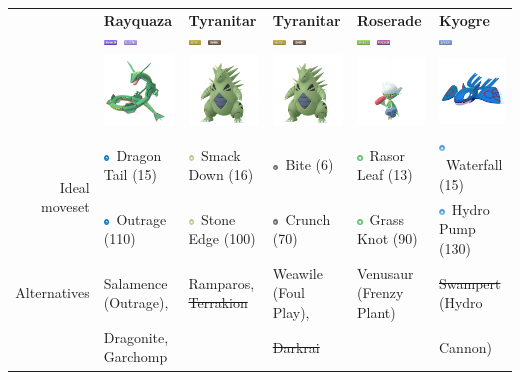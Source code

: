 \documentclass[8pt,aspectratio=169,compress]{beamer}
\newcommand{\darkfull}{\includegraphics[height=0.15cm]{../../images/type/full/Dark.png}}
\newcommand{\flyingfull}{\includegraphics[height=0.15cm]{../../images/type/full/Flying.png}}
\newcommand{\dragonfull}{\includegraphics[height=0.15cm]{../../images/type/full/Dragon.png}}
\newcommand{\grassfull}{\includegraphics[height=0.15cm]{../../images/type/full/Grass.png}}
\newcommand{\rockfull}{\includegraphics[height=0.15cm]{../../images/type/full/Rock.png}}
\newcommand{\waterfull}{\includegraphics[height=0.15cm]{../../images/type/full/Water.png}}
\newcommand{\poisonfull}{\includegraphics[height=0.15cm]{../../images/type/full/Poison.png}}
\newcommand{\dragonsimp}{\includegraphics[height=0.15cm]{../../images/type/simplified/dragon.png}}
\newcommand{\darksimp}{\includegraphics[height=0.15cm]{../../images/type/simplified/dark.png}}
\newcommand{\rocksimp}{\includegraphics[height=0.15cm]{../../images/type/simplified/rock.png}}
\newcommand{\watersimp}{\includegraphics[height=0.15cm]{../../images/type/simplified/water.png}}
\newcommand{\grasssimp}{\includegraphics[height=0.15cm]{../../images/type/simplified/grass.png}}
\begin{document}
\begin{frame}
\begin{tiny}
\begin{block}{}
\begin{center}
\bigskip

\begin{tabular}{rp{2cm}p{2cm}p{2cm}p{2cm}p{2cm}} 
    & \textbf{Rayquaza} \hfill \dragonfull~\flyingfull &  \textbf{Tyranitar} \hfill \rockfull~\darkfull &  \textbf{Tyranitar} \hfill \rockfull~\darkfull  &  \textbf{Roserade} \hfill \grassfull~\poisonfull  & \textbf{Kyogre} \hfill  \waterfull \\ 
    &  \multicolumn{1}{c}{\includegraphics[width=2cm]{../../images/pokemon/Rayquaza}} &   \multicolumn{1}{c}{\includegraphics[width=2cm]{../../images/pokemon/Tyranitar} }  &   \multicolumn{1}{c}{\includegraphics[width=2cm]{../../images/pokemon/Tyranitar} }   &   \multicolumn{1}{c}{\includegraphics[width=2cm]{../../images/pokemon/Roserade} }   &   \multicolumn{1}{c}{\includegraphics[width=2cm]{../../images/pokemon/Kyogre} } \\ \hline
\multirow{2}{*}{Ideal moveset}   & \dragonsimp~Dragon Tail (15) & \rocksimp~Smack Down (16)  & \darksimp~Bite (6)& \grasssimp~Rasor Leaf (13) & \watersimp~Waterfall (15) \\
    &\dragonsimp~Outrage (110) &\rocksimp~Stone Edge (100) & \darksimp~Crunch (70)& \grasssimp~Grass Knot (90) & \watersimp~Hydro Pump (130)  \\  \hline  
Alternatives & Salamence (Outrage),  & Ramparos, \sout{Terrakion} & Weawile (Foul Play),  & Venusaur (Frenzy Plant) & \sout{Swampert} (Hydro  \\
 & Dragonite, Garchomp & & \sout{Darkrai} & & Cannon)
\end{tabular}

\end{center}
\end{block}
\end{tiny}
\end{frame}
\end{document}
